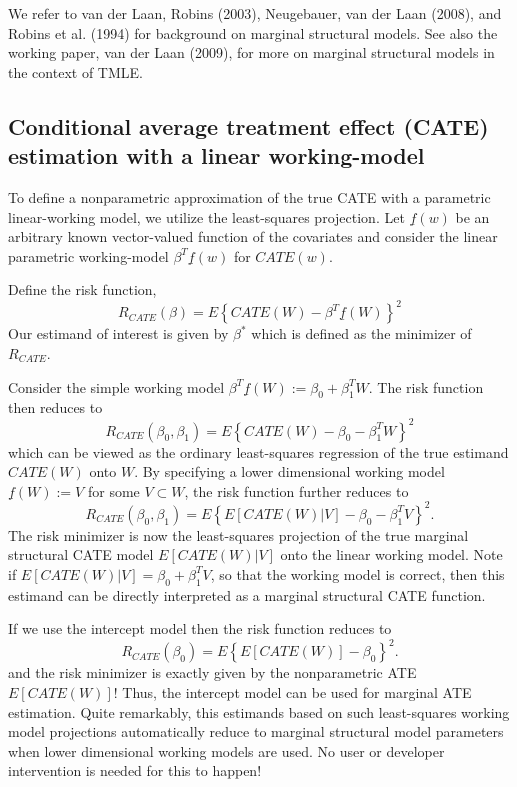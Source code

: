 \documentclass{article}
\begin{document}
We refer to van der Laan, Robins (2003), Neugebauer, van der Laan (2008), and Robins et al. (1994) for  background on marginal structural models. See also the working paper, van der Laan (2009), for more on marginal structural models in the context of TMLE.

\nocite{NEUGEBAUER2007419}
\nocite{vanderlaanunified}
\nocite{laan_rubin_2006}
\nocite{robinsCausal}

\subsection{Conditional average treatment effect (CATE) estimation with a linear working-model}
 

To define a nonparametric approximation of the true CATE with a parametric linear-working model, we utilize the least-squares projection. Let $\underline{f}(w)$ be an arbitrary known vector-valued function of the covariates and consider the linear parametric working-model $\beta^T \underline{f}(w)$ for $CATE(w)$. 

\noindent Define the risk function,
$$R_{CATE}(\beta) = E \left\{CATE(W) - \beta^T \underline{f}(W)\right\}^2$$
Our estimand of interest is given by $\beta^*$ which is defined as the minimizer of $R_{CATE}$.

\noindent Consider the simple working model $\beta^T\underline{f}(W) := \beta_0 + \beta_1^T W$. The risk function then reduces to
$$R_{CATE}(\beta_0, \beta_1) = E \left\{CATE(W) - \beta_0 - \beta_1^T W\right\}^2$$
which can be viewed as the ordinary least-squares regression of the true estimand $CATE(W)$ onto $W$. By specifying a lower dimensional working model $\underline{f}(W) := V$ for some $V \subset W$, the risk function further reduces to
$$R_{CATE}(\beta_0, \beta_1) = E \left\{E[CATE(W)|V] - \beta_0 - \beta_1^T V\right\}^2.$$
The risk minimizer is now the least-squares projection of the true marginal structural CATE model $E[CATE(W)|V]$ onto the linear working model. Note if $E[CATE(W)|V] =  \beta_0 + \beta_1^T V$, so that the working model is correct, then this estimand can be directly interpreted as a marginal structural CATE function.

\noindent  If we use the intercept model then the risk function reduces to
$$R_{CATE}(\beta_0) = E \left\{E[CATE(W)] - \beta_0 \right\}^2.$$
and the risk minimizer is exactly given by the nonparametric ATE $E[CATE(W)]$! Thus, the intercept model can be used for marginal ATE estimation. Quite remarkably, this estimands based on such least-squares working model projections automatically reduce to marginal structural model parameters when lower dimensional working models are used. No user or developer intervention is needed for this to happen! 
\end{document}
